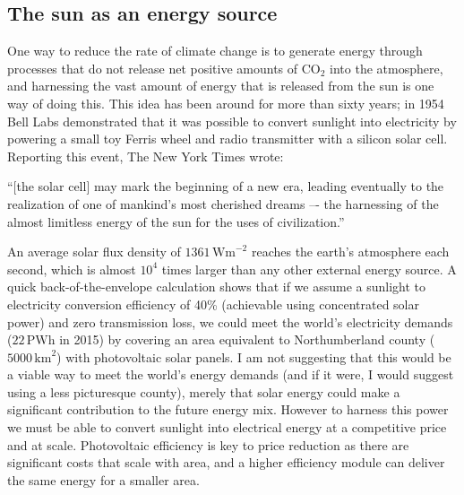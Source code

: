 


\subsection{The sun as an energy source}
One way to reduce the rate of climate change is to generate energy through processes that do not release net positive amounts of CO$_2$ into the atmosphere, and harnessing the vast amount of energy that is released from the sun is one way of doing this. This idea has been around for more than sixty years; in 1954 Bell Labs demonstrated that it was possible to convert sunlight into electricity by powering a small toy Ferris wheel and radio transmitter with a silicon solar cell. Reporting this event, The New York Times wrote:\autocite{NYT}
\begin{displayquote}
“[the solar cell] may mark the beginning of a new era, leading eventually to the realization of one of mankind’s most cherished dreams –- the harnessing of the almost limitless energy of the sun for the uses of civilization.”
\end{displayquote}
An average solar flux density of $1361\,\textrm{Wm}^{-2}$ reaches the earth's atmosphere each second, which is almost $10^4$ times larger than any other external energy source.\autocite{Kopp2011} A quick back-of-the-envelope calculation shows that if we assume a sunlight to electricity conversion efficiency of 40\% (achievable using concentrated solar power) and zero transmission loss, we could meet the world's electricity demands ($22\,\textrm{PWh}$ in 2015)\autocite{IEA2017} by covering an area equivalent to Northumberland county ($5000\,\textrm{km}^2$) with photovoltaic solar panels.
I am not suggesting that this would be a viable way to meet the world's energy demands (and if it were, I would suggest using a less picturesque county), merely that solar energy could make a significant contribution to the future energy mix.
%
However to harness this power we must be able to convert sunlight into electrical energy at a competitive price and at scale. Photovoltaic efficiency is key to price reduction as there are significant costs that scale with area,\autocite{Fraunhofer2015,Green2016} and a higher efficiency module can deliver the same energy for a smaller area.

